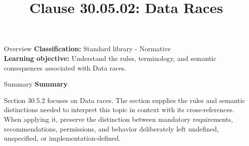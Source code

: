 \documentclass[10pt,letterpaper]{article}
\title{Clause 30.05.02: Data Races}
\author{}
\date{}
\begin{document}
\maketitle
\begin{CornellOverviewBox}{Overview}
\textbf{Classification:} Standard library - Normative\\[2pt]
\textbf{Learning objective:} Understand the rules, terminology, and semantic consequences associated with Data races.
\end{CornellOverviewBox}\begin{CornellSummaryBox}{Summary}
{\sffamily\bfseries\color{Accent} Summary}\par\vspace{3pt}Section 30.5.2 focuses on Data races. The section supplies the rules and semantic distinctions needed to interpret this topic in context with its cross-references. When applying it, preserve the distinction between mandatory requirements, recommendations, permissions, and behavior deliberately left undefined, unspecified, or implementation-defined.
\end{CornellSummaryBox}
\end{document}
